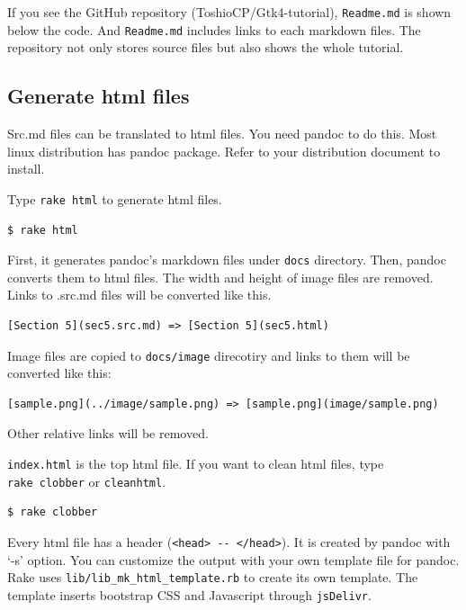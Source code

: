 If you see the GitHub repository (ToshioCP/Gtk4-tutorial),
\texttt{Readme.md} is shown below the code. And \texttt{Readme.md}
includes links to each markdown files. The repository not only stores
source files but also shows the whole tutorial.

\subsection{Generate html files}\label{generate-html-files}

Src.md files can be translated to html files. You need pandoc to do
this. Most linux distribution has pandoc package. Refer to your
distribution document to install.

Type \texttt{rake\ html} to generate html files.

\begin{verbatim}
$ rake html
\end{verbatim}

First, it generates pandoc's markdown files under \texttt{docs}
directory. Then, pandoc converts them to html files. The width and
height of image files are removed. Links to .src.md files will be
converted like this.

\begin{verbatim}
[Section 5](sec5.src.md) => [Section 5](sec5.html)
\end{verbatim}

Image files are copied to \texttt{docs/image} direcotiry and links to
them will be converted like this:

\begin{verbatim}
[sample.png](../image/sample.png) => [sample.png](image/sample.png)
\end{verbatim}

Other relative links will be removed.

\texttt{index.html} is the top html file. If you want to clean html
files, type \texttt{rake\ clobber} or \texttt{cleanhtml}.

\begin{verbatim}
$ rake clobber
\end{verbatim}

Every html file has a header
(\texttt{\textless{}head\textgreater{}\ -\/-\ \textless{}/head\textgreater{}}).
It is created by pandoc with `-s' option. You can customize the output
with your own template file for pandoc. Rake uses
\texttt{lib/lib\_mk\_html\_template.rb} to create its own template. The
template inserts bootstrap CSS and Javascript through \texttt{jsDelivr}.

